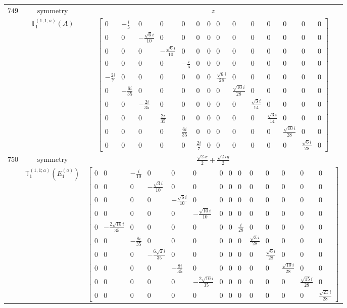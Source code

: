 \documentclass[fleqn,8pt,landscape]{jsarticle}
\begin{document}
\begin{longtable}{ccc}
$ 749 $ & $ \text{symmetry} $ & $ z $ \\
$  $ & $ \mathbb{T}_{1}^{(1,1;a)}(A) $ & $ \begin{bmatrix} 0 & - \frac{i}{5} & 0 & 0 & 0 & 0 & 0 & 0 & 0 & 0 & 0 & 0 & 0 & 0 \\ 0 & 0 & - \frac{\sqrt{6} i}{10} & 0 & 0 & 0 & 0 & 0 & 0 & 0 & 0 & 0 & 0 & 0 \\ 0 & 0 & 0 & - \frac{\sqrt{6} i}{10} & 0 & 0 & 0 & 0 & 0 & 0 & 0 & 0 & 0 & 0 \\ 0 & 0 & 0 & 0 & - \frac{i}{5} & 0 & 0 & 0 & 0 & 0 & 0 & 0 & 0 & 0 \\ - \frac{2 i}{7} & 0 & 0 & 0 & 0 & 0 & 0 & \frac{\sqrt{6} i}{28} & 0 & 0 & 0 & 0 & 0 & 0 \\ 0 & - \frac{6 i}{35} & 0 & 0 & 0 & 0 & 0 & 0 & \frac{\sqrt{10} i}{28} & 0 & 0 & 0 & 0 & 0 \\ 0 & 0 & - \frac{2 i}{35} & 0 & 0 & 0 & 0 & 0 & 0 & \frac{\sqrt{3} i}{14} & 0 & 0 & 0 & 0 \\ 0 & 0 & 0 & \frac{2 i}{35} & 0 & 0 & 0 & 0 & 0 & 0 & \frac{\sqrt{3} i}{14} & 0 & 0 & 0 \\ 0 & 0 & 0 & 0 & \frac{6 i}{35} & 0 & 0 & 0 & 0 & 0 & 0 & \frac{\sqrt{10} i}{28} & 0 & 0 \\ 0 & 0 & 0 & 0 & 0 & \frac{2 i}{7} & 0 & 0 & 0 & 0 & 0 & 0 & \frac{\sqrt{6} i}{28} & 0 \end{bmatrix} $ \\ \hline
$ 750 $ & $ \text{symmetry} $ & $ \frac{\sqrt{2} x}{2} + \frac{\sqrt{2} i y}{2} $ \\
$  $ & $ \mathbb{T}_{1}^{(1,1;a)}(E_{1}^{(a)}) $ & $ \begin{bmatrix} 0 & 0 & - \frac{i}{10} & 0 & 0 & 0 & 0 & 0 & 0 & 0 & 0 & 0 & 0 & 0 \\ 0 & 0 & 0 & - \frac{\sqrt{3} i}{10} & 0 & 0 & 0 & 0 & 0 & 0 & 0 & 0 & 0 & 0 \\ 0 & 0 & 0 & 0 & - \frac{\sqrt{6} i}{10} & 0 & 0 & 0 & 0 & 0 & 0 & 0 & 0 & 0 \\ 0 & 0 & 0 & 0 & 0 & - \frac{\sqrt{10} i}{10} & 0 & 0 & 0 & 0 & 0 & 0 & 0 & 0 \\ 0 & - \frac{2 \sqrt{10} i}{35} & 0 & 0 & 0 & 0 & 0 & 0 & \frac{i}{28} & 0 & 0 & 0 & 0 & 0 \\ 0 & 0 & - \frac{8 i}{35} & 0 & 0 & 0 & 0 & 0 & 0 & \frac{\sqrt{3} i}{28} & 0 & 0 & 0 & 0 \\ 0 & 0 & 0 & - \frac{6 \sqrt{2} i}{35} & 0 & 0 & 0 & 0 & 0 & 0 & \frac{\sqrt{6} i}{28} & 0 & 0 & 0 \\ 0 & 0 & 0 & 0 & - \frac{8 i}{35} & 0 & 0 & 0 & 0 & 0 & 0 & \frac{\sqrt{10} i}{28} & 0 & 0 \\ 0 & 0 & 0 & 0 & 0 & - \frac{2 \sqrt{10} i}{35} & 0 & 0 & 0 & 0 & 0 & 0 & \frac{\sqrt{15} i}{28} & 0 \\ 0 & 0 & 0 & 0 & 0 & 0 & 0 & 0 & 0 & 0 & 0 & 0 & 0 & \frac{\sqrt{21} i}{28} \end{bmatrix} $ \\ \hline

\end{longtable}
\end{document}
